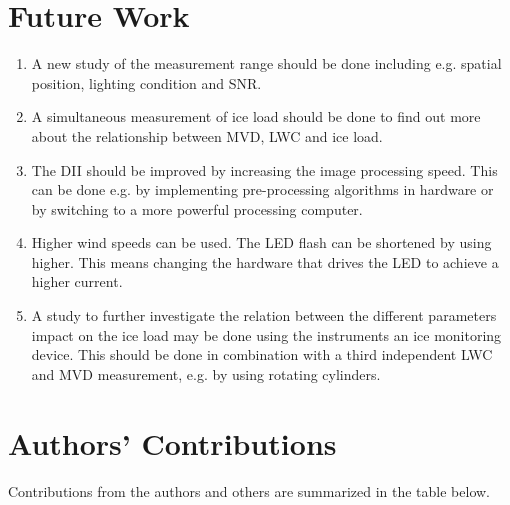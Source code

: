 \section{Future Work}

\begin{enumerate}
\item
A new study of the measurement range should be done including e.g. spatial position, lighting condition and SNR.

\item
A simultaneous measurement of ice load should be done to find out more about the relationship between MVD, LWC and ice load.

\item
The DII should be improved by increasing the image processing speed. This can be done e.g. by implementing pre-processing algorithms in hardware or by switching to a more powerful processing computer.

\item
Higher wind speeds can be used. The LED flash can be shortened by using higher. This means changing the hardware that drives the LED to achieve a higher current.

\item
A study to further investigate the relation between the different parameters impact on the ice load may be done using the instruments an ice monitoring device. This should be done in combination with a third independent LWC and MVD measurement, e.g. by using rotating cylinders\cite{makk1992}.

\end{enumerate}

\section{Authors' Contributions}

Contributions from the authors and others are summarized in the table below.


